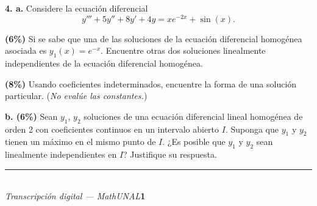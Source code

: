 \documentclass[11pt]{article}
\begin{document}
\noindent\textbf{4. a.} Considere la ecuación diferencial
\[
y'''+5y''+8y'+4y=xe^{-2x}+\sin(x).
\]

\begin{opciones}
\item[i.] \textbf{(6\%)} Si se sabe que una de las soluciones de la ecuación diferencial homogénea asociada es $y_1(x)=e^{-x}$. Encuentre otras dos soluciones linealmente independientes de la ecuación diferencial homogénea.
\item[ii.] \textbf{(8\%)} Usando coeficientes indeterminados, encuentre la forma de una solución particular. (\textit{No evalúe las constantes.})
\end{opciones}

\vspace{0.4cm}
\noindent\textbf{b. (6\%)} Sean $y_1$, $y_2$ soluciones de una ecuación diferencial lineal homogénea de orden 2 con coeficientes continuos en un intervalo abierto $I$. Suponga que $y_1$ y $y_2$ tienen un máximo en el mismo punto de $I$. ¿Es posible que $y_1$ y $y_2$ sean linealmente independientes en $I$? Justifique su respuesta.

\vspace{8cm}

\vfill
\rule{\linewidth}{0.4pt}\\[1pt]
{\scriptsize\textit{Transcripción digital --- MathUNAL}\hfill\textcolor{unalblue}{\textbf{1}}}
\end{document}
